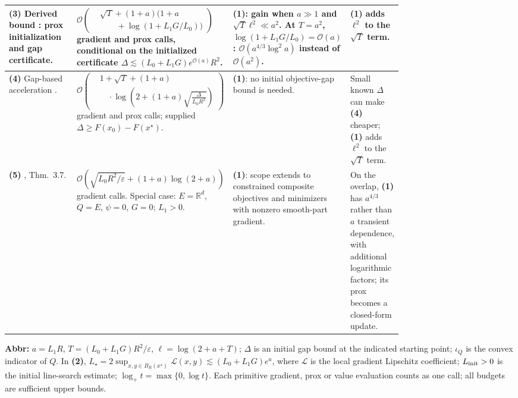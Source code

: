 \begin{table}[tp]
\begin{threeparttable}
\begin{tabularx}{\linewidth}{@{}>{\raggedright\arraybackslash}p{0.20\linewidth}>{\raggedright\arraybackslash}p{0.32\linewidth}>{\raggedright\arraybackslash}p{0.25\linewidth}>{\raggedright\arraybackslash}X@{}}
\textbf{(3)} Derived bound \citep{cgCompositeGeneralizedSource}: prox initialization and gap certificate.
& $\mathcal{O}\!\left(\begin{aligned}&\sqrt T+(1+a)\bigl(1+a\\[-2pt]&\qquad+\log(1+L_1G/L_0)\bigr)\end{aligned}\right)$ gradient and prox calls, conditional on the initialized certificate $\Delta\lesssim(L_0+L_1G)e^{\mathcal{O}(a)}R^2$.
& \textbf{(1)}: gain when $a\gg1$ and $\sqrt T\ell^2\ll a^2$. At $T=a^2$, $\log(1+L_1G/L_0)=\mathcal{O}(a)$: $\mathcal{O}(a^{4/3}\log^2 a)$ instead of $\mathcal{O}(a^2)$.
& \textbf{(1)} adds $\ell^2$ to the $\sqrt T$ term. \\
\midrule
\textbf{(4)} Gap-based acceleration \citep{cgCompositeGeneralizedSource}.
& $\mathcal{O}\!\left(\begin{aligned}&1+\sqrt T+(1+a)\\[-2pt]&\quad\cdot\log\!\left(2+(1+a)\sqrt{\frac{\Delta}{L_0R^2}}\right)\end{aligned}\right)$ gradient and prox calls; supplied $\Delta\geq F(x_0)-F(x^\star)$.
& \textbf{(1)}: no initial objective-gap bound is needed.
& Small known $\Delta$ can make \textbf{(4)} cheaper; \textbf{(1)} adds $\ell^2$ to the $\sqrt T$ term. \\
\midrule
\textbf{(5)} \citep{mirrorEverestV2}, Thm.~3.7.
& $\mathcal{O}\!\left(\sqrt{L_0R^2/\varepsilon}+(1+a)\log(2+a)\right)$ gradient calls. Special case: $E=\mathbb R^d$, $Q=E$, $\psi=0$, $G=0$; $L_1>0$.
& \textbf{(1)}: scope extends to constrained composite objectives and minimizers with nonzero smooth-part gradient.
& On the overlap, \textbf{(1)} has $a^{4/3}$ rather than $a$ transient dependence, with additional logarithmic factors; its prox becomes a closed-form update. \\
\bottomrule
\end{tabularx}
\begin{tablenotes}[flushleft]\footnotesize
\item[] \textbf{Abbr:} $a=L_1R$, $T=(L_0+L_1G)R^2/\varepsilon$, $\ell=\log(2+a+T)$; $\Delta$ is an initial gap bound at the indicated starting point; $\iota_Q$ is the convex indicator of $Q$. In \textbf{(2)}, $L_\star=2\sup_{x,y\in B_R(x^\star)}\mathcal L(x,y)\lesssim(L_0+L_1G)e^a$, where $\mathcal L$ is the local gradient Lipschitz coefficient; $L_{\rm init}>0$ is the initial line-search estimate; $\log_+t=\max\{0,\log t\}$. Each primitive gradient, prox or value evaluation counts as one call; all budgets are sufficient upper bounds.
\end{tablenotes}
\end{threeparttable}
\end{table}
\clearpage
